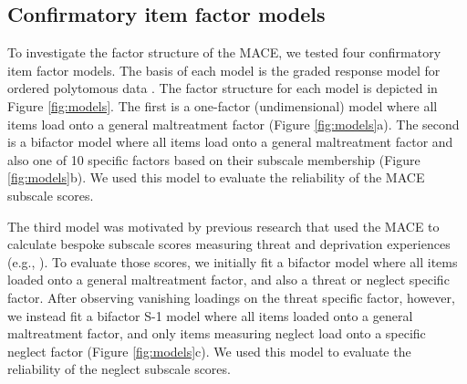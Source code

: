 \documentclass[letterpaper,man,natbib,longtable,floatsintext,12pt]{apa6}
\begin{document}
\subsection{Confirmatory item factor models}

To investigate the factor structure of the MACE, we tested four confirmatory item factor models. The basis of each model is the graded response model for ordered polytomous data \citep{samejima1997graded}. The factor structure for each model is depicted in Figure \ref{fig:models}. The first is a one-factor (undimensional) model where all items load onto a general maltreatment factor (Figure \ref{fig:models}a). The second is a bifactor model where all items load onto a general maltreatment factor and also one of 10 specific factors based on their subscale membership (Figure \ref{fig:models}b). We used this model to evaluate the reliability of the MACE subscale scores. 

The third model was motivated by previous research that used the MACE to calculate bespoke subscale scores measuring threat and deprivation experiences (e.g., \citealt{teicher2018differential}). To evaluate those scores, we initially fit a bifactor model where all items loaded onto a general maltreatment factor, and also a threat or neglect specific factor. After observing vanishing loadings on the threat specific factor, however, we instead fit a bifactor S-1 model \citep{eid2017anomalous} where all items loaded onto a general maltreatment factor, and only items measuring neglect load onto a specific neglect factor (Figure \ref{fig:models}c). We used this model to evaluate the reliability of the neglect subscale scores. 
\end{document}
